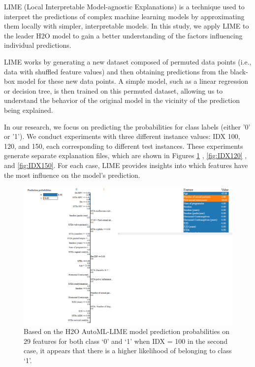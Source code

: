 \documentclass{llncs}
\begin{document}
LIME (Local Interpretable Model-agnostic Explanations) is a technique used to interpret the predictions of complex machine learning models by approximating them locally with simpler, interpretable models. In this study, we apply LIME to the leader H2O model to gain a better understanding of the factors influencing individual predictions.

LIME works by generating a new dataset composed of permuted data points (i.e., data with shuffled feature values) and then obtaining predictions from the black-box model for these new data points. A simple model, such as a linear regression or decision tree, is then trained on this permuted dataset, allowing us to understand the behavior of the original model in the vicinity of the prediction being explained.

In our research, we focus on predicting the probabilities for class labels (either '0' or '1'). We conduct experiments with three different instance values: IDX 100, 120, and 150, each corresponding to different test instances. These experiments generate separate explanation files, which are shown in Figures \ref{fig:IDX100} , \ref{fig:IDX120} , and \ref{fig:IDX150}. For each case, LIME provides insights into which features have the most influence on the model’s prediction.


\begin{figure}[htbp]
	\centering
	\includegraphics[width=1\textwidth]{images/result1}
	\caption{Based on the H2O AutoML-LIME model prediction probabilities on 29 features for both class ‘0’ and ‘1’ when IDX = 100 in the second case, it appears that there is a higher likelihood of belonging to class ‘1’.}
	\label{fig:IDX100}
\end{figure}
\end{document}
